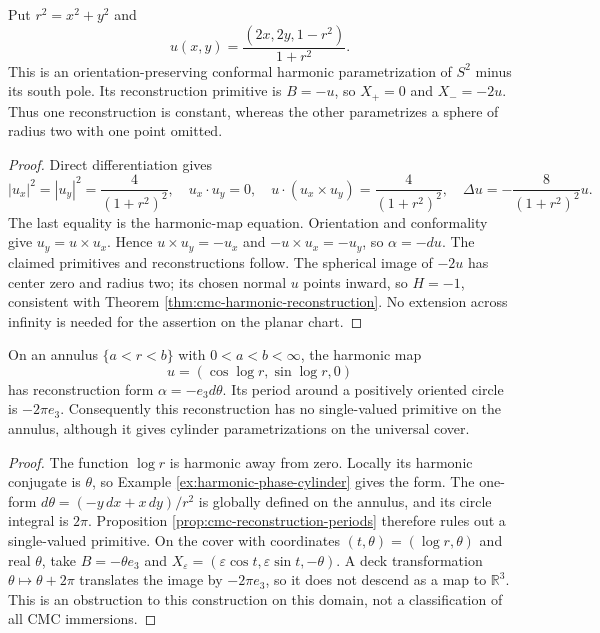 \begin{example}\label{ex:stereographic-cmc-reconstruction}
Put $r^2=x^2+y^2$ and
\[
 u(x,y)=\frac{(2x,2y,1-r^2)}{1+r^2}.
\]
This is an orientation-preserving conformal harmonic parametrization of $S^2$ minus its south pole. Its reconstruction primitive is $B=-u$, so $X_+=0$ and $X_-=-2u$. Thus one reconstruction is constant, whereas the other parametrizes a sphere of radius two with one point omitted.
\end{example}
\begin{proof}
Direct differentiation gives
\[
 |u_x|^2=|u_y|^2=\frac4{(1+r^2)^2},\quad
 u_x\cdot u_y=0,\quad u\cdot(u_x\times u_y)=\frac4{(1+r^2)^2},
 \quad\Delta u=-\frac8{(1+r^2)^2}u.
\]
The last equality is the harmonic-map equation. Orientation and conformality give $u_y=u\times u_x$. Hence $u\times u_y=-u_x$ and $-u\times u_x=-u_y$, so $\alpha=-du$. The claimed primitives and reconstructions follow. The spherical image of $-2u$ has center zero and radius two; its chosen normal $u$ points inward, so $H=-1$, consistent with Theorem \ref{thm:cmc-harmonic-reconstruction}. No extension across infinity is needed for the assertion on the planar chart.
\end{proof}

\begin{example}\label{ex:cmc-logarithmic-period}
On an annulus $\{a<r<b\}$ with $0<a<b<\infty$, the harmonic map
\[
 u=(\cos\log r,\sin\log r,0)
\]
has reconstruction form $\alpha=-e_3d\theta$. Its period around a positively oriented circle is $-2\pi e_3$. Consequently this reconstruction has no single-valued primitive on the annulus, although it gives cylinder parametrizations on the universal cover.
\end{example}
\begin{proof}
The function $\log r$ is harmonic away from zero. Locally its harmonic conjugate is $\theta$, so Example \ref{ex:harmonic-phase-cylinder} gives the form. The one-form $d\theta=(-y\,dx+x\,dy)/r^2$ is globally defined on the annulus, and its circle integral is $2\pi$. Proposition \ref{prop:cmc-reconstruction-periods} therefore rules out a single-valued primitive. On the cover with coordinates $(t,\theta)=(\log r,\theta)$ and real $\theta$, take $B=-\theta e_3$ and $X_\varepsilon=(\varepsilon\cos t,\varepsilon\sin t,-\theta)$. A deck transformation $\theta\mapsto\theta+2\pi$ translates the image by $-2\pi e_3$, so it does not descend as a map to $\mathbb R^3$. This is an obstruction to this construction on this domain, not a classification of all CMC immersions.
\end{proof}
